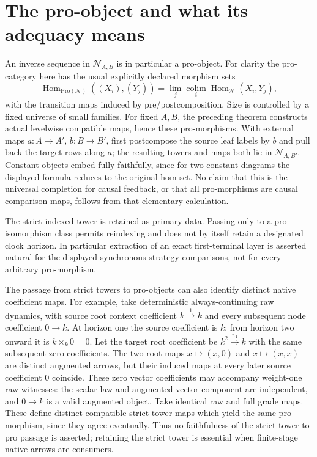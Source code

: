 \documentclass[11pt]{article}
\begin{document}
\section{The pro-object and what its adequacy means}
An inverse sequence in $\mathcal N_{A,B}$ is in particular a pro-object. For clarity the pro-category here has the usual explicitly declared morphism sets
\[
 \operatorname{Hom}_{\mathrm{Pro}(\mathcal N)}((X_i),(Y_j))
 =\lim_j\operatorname*{colim}_i\operatorname{Hom}_{\mathcal N}(X_i,Y_j),
\]
with the transition maps induced by pre/postcomposition. Size is controlled by a fixed universe of small families. For fixed $A,B$, the preceding theorem constructs actual levelwise compatible maps, hence these pro-morphisms. With external maps $a:A\to A'$, $b:B\to B'$, first postcompose the source leaf labels by $b$ and pull back the target rows along $a$; the resulting towers and maps both lie in $\mathcal N_{A,B'}$. Constant objects embed fully faithfully, since for two constant diagrams the displayed formula reduces to the original hom set. No claim that this is the universal completion for causal feedback, or that all pro-morphisms are causal comparison maps, follows from that elementary calculation.

The strict indexed tower is retained as primary data. Passing only to a pro-isomorphism class permits reindexing and does not by itself retain a designated clock horizon. In particular extraction of an exact first-terminal layer is asserted natural for the displayed synchronous strategy comparisons, not for every arbitrary pro-morphism.

The passage from strict towers to pro-objects can also identify distinct native coefficient maps. For example, take deterministic always-continuing raw dynamics, with source root context coefficient $k\xrightarrow{1}k$ and every subsequent node coefficient $0\to k$. At horizon one the source coefficient is $k$; from horizon two onward it is $k\times_k0=0$. Let the target root coefficient be $k^2\xrightarrow{\pi_1}k$ with the same subsequent zero coefficients. The two root maps $x\mapsto(x,0)$ and $x\mapsto(x,x)$ are distinct augmented arrows, but their induced maps at every later source coefficient $0$ coincide. These zero vector coefficients may accompany weight-one raw witnesses: the scalar law and augmented-vector component are independent, and $0\to k$ is a valid augmented object. Take identical raw and full grade maps. These define distinct compatible strict-tower maps which yield the same pro-morphism, since they agree eventually. Thus no faithfulness of the strict-tower-to-pro passage is asserted; retaining the strict tower is essential when finite-stage native arrows are consumers.
\end{document}
